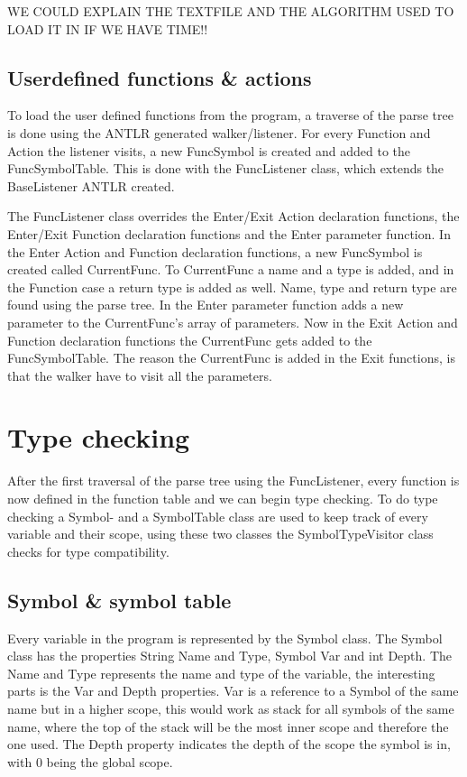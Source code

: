 WE COULD EXPLAIN THE TEXTFILE AND THE ALGORITHM USED TO LOAD IT IN IF WE HAVE TIME!!

\subsection{Userdefined functions \& actions}
To load the user defined functions from the program, a traverse of the parse tree is done using the ANTLR generated walker/listener. For every Function and Action the listener visits, a new FuncSymbol is created and added to the FuncSymbolTable. This is done with the FuncListener class, which extends the BaseListener ANTLR created.
 
The FuncListener class overrides the Enter/Exit Action declaration functions, the Enter/Exit Function declaration functions and the Enter parameter function. In the Enter Action and Function declaration functions, a new FuncSymbol is created called CurrentFunc. To CurrentFunc a name and a type is added, and in the Function case a return type is added as well. Name, type and return type are found using the parse tree.
In the Enter parameter function adds a new parameter to the CurrentFunc's array of parameters. 
Now in the Exit Action and Function declaration functions the CurrentFunc gets added to the FuncSymbolTable. 
The reason the CurrentFunc is added in the Exit functions, is that the walker have to visit all the parameters. 

\section{Type checking} 
After the first traversal of the parse tree using the FuncListener, every function is now defined in the function table and we can begin type checking. To do type checking a Symbol- and a SymbolTable class are used to keep track of every variable and their scope, using these two classes the SymbolTypeVisitor class checks for type compatibility. 

\subsection{Symbol \& symbol table}
Every variable in the program is represented by the Symbol class. The Symbol class has the properties String Name and Type, Symbol Var and int Depth. The Name and Type represents the name and type of the variable, the interesting parts is the Var and Depth properties. Var is a reference to a Symbol of the same name but in a higher scope, this would work as stack for all symbols of the same name, where the top of the stack will be the most inner scope and therefore the one used. The Depth property indicates the depth of the scope the symbol is in, with 0 being the global scope. 

